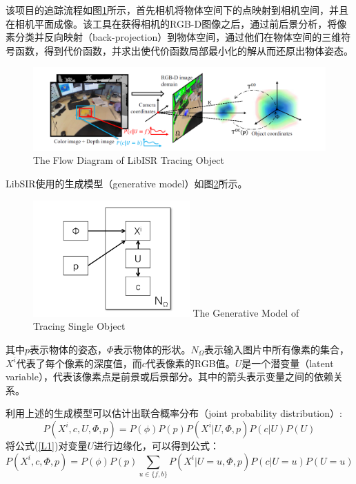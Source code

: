 该项目的追踪流程如图\ref{fig:model}所示，首先相机将物体空间下的点映射到相机空间，并且在相机平面成像。该工具在获得相机的RGB-D图像之后，通过前后景分析，将像素分类并反向映射（back-projection）到物体空间，通过他们在物体空间的三维符号函数，得到代价函数，并求出使代价函数局部最小化的解从而还原出物体姿态。

\begin{figure}[!htp]
  \centering
  \includegraphics[width=14cm]{figure/model.png}
    {The Flow Diagram of LibISR Tracing Object }
 \label{fig:model}
\end{figure}

LibSIR使用的生成模型（generative model）如图\ref{fig:Gmodel}所示。

\begin{figure}[!htp]
  \centering
  \includegraphics[width=6cm]{figure/jointModel.png}
    {The Generative Model of Tracing Single Object}
 \label{fig:Gmodel}
\end{figure}

其中$p$表示物体的姿态，$\Phi$表示物体的形状。$N_\Omega$表示输入图片中所有像素的集合，$X^i$代表了每个像素的深度值，而$c$代表像素的RGB值。$U$是一个潜变量（latent variable），代表该像素点是前景或后景部分。其中的箭头表示变量之间的依赖关系。

利用上述的生成模型可以估计出联合概率分布（joint probability distribution）:
\begin{equation}
 P(X^i, c, U, \Phi, p) = P(\phi)P(p)P(X^i|U, \Phi, p)P(c|U)P(U)\label{L1}
\end{equation}
将公式(\ref{L1})对变量$U$进行边缘化，可以得到公式：
\begin{equation}
 P(X^i, c, \Phi, p) = P(\phi)P(p)\sum_{u\in\{f,b\}}P(X^i|U=u, \Phi, p)P(c|U=u)P(U=u)\label{L2}
\end{equation}

